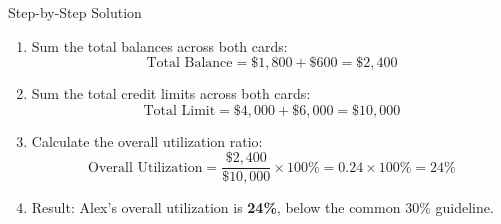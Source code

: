 \footnotesize
\begin{block}{Step-by-Step Solution}
  \begin{enumerate}
    \item Sum the total balances across both cards:
      \[
        \text{Total Balance} = \$1,800 + \$600 = \$2,400
      \]
    \item Sum the total credit limits across both cards:
      \[
        \text{Total Limit} = \$4,000 + \$6,000 = \$10,000
      \]
    \item Calculate the overall utilization ratio:
      \[
        \text{Overall Utilization} = \frac{\$2,400}{\$10,000} \times 100\% = 0.24 \times 100\% = 24\%
      \]
    \item Result: Alex's overall utilization is \textbf{24\%}, below the common 30\% guideline.
  \end{enumerate}
\end{block}
